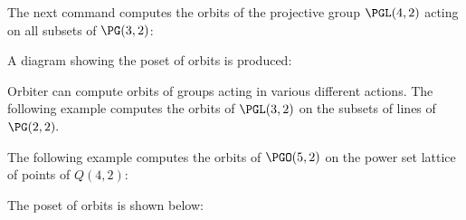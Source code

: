 

\bigskip

The next command computes the orbits of the projective group $\PGL(4,2)$ 
acting on all subsets of $\PG(3,2)$:


A diagram showing the poset of orbits is produced:



\bigskip

Orbiter can compute orbits of groups acting in various different actions. 
The following example computes the orbits of $\PGL(3,2)$ 
on the subsets of lines of $\PG(2,2).$




\bigskip

The following example computes the orbits of $\PGO(5,2)$ 
on the power set lattice of points of $Q(4,2)$:


The poset of orbits is shown below: 

